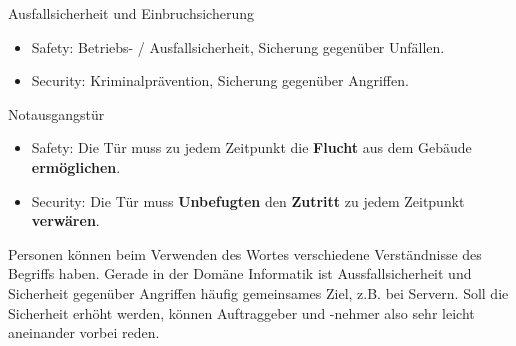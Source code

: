 \begin{solution}
	Ausfallsicherheit und Einbruchsicherung
	\begin{itemize}
		\item Safety: Betriebs- / Ausfallsicherheit, Sicherung gegenüber Unfällen.
		\item Security: Kriminalprävention, Sicherung gegenüber Angriffen.
	\end{itemize}
\end{solution}

\begin{solution}
	Notausgangstür
	\begin{itemize}
		\item Safety: Die Tür muss zu jedem Zeitpunkt die \textbf{Flucht} aus dem Gebäude \textbf{ermöglichen}.
		\item Security: Die Tür muss \textbf{Unbefugten} den \textbf{Zutritt} zu jedem Zeitpunkt \textbf{verwären}.
	\end{itemize}
\end{solution}

\begin{solution}
	Personen können beim Verwenden des Wortes verschiedene Verständnisse des Begriffs haben. Gerade in der Domäne Informatik ist Aussfallsicherheit und Sicherheit gegenüber Angriffen häufig gemeinsames Ziel, z.B. bei Servern. Soll die Sicherheit erhöht werden, können Auftraggeber und -nehmer also sehr leicht aneinander vorbei reden. 
\end{solution}
~